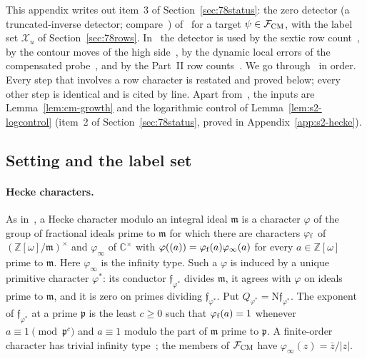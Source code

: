 \documentclass[11pt]{article}
\numberwithin{equation}{section}
\newcommand{\OO}{\mathbb Z[\omega]}
\newcommand{\N}{\mathrm N}
\begin{document}
This appendix writes out item~3 of Section~\ref{sec:78status}: the zero detector (a truncated-inverse detector; compare~\cite[Appendix~C]{MP24})
of~\cite[Section~8]{OAI78} for a target $\psi\in\mathcal F_{\rm CM}$, with the
label set $\mathcal X_u$ of Section~\ref{sec:78rows}. In~\cite{OAI78} the detector is used by the
sextic row count~\cite[Prop.~9.2]{OAI78}, by the contour moves of the high
side~\cite[Lemma~10.3]{OAI78}, by the dynamic local errors of the compensated
probe~\cite[Section~16.2]{OAI78}, and by the Part~II row counts~\cite[Section~19]{OAI78}.
We go through~\cite[Section~8]{OAI78} in order. Every step that involves a row character is
restated and proved below; every other step is identical and is cited by line. Apart
from~\cite{OAI78}, the inputs are Lemma~\ref{lem:cm-growth} and the logarithmic control of
Lemma~\ref{lem:s2-logcontrol} (item~2 of Section~\ref{sec:78status}, proved in Appendix~\ref{app:s2-hecke}).

\subsection{Setting and the label set}

\paragraph{Hecke characters.} As in~\cite[Ch.~VII, \S6]{Neukirch}, a Hecke character modulo an
integral ideal $\mathfrak m$ is a character $\varphi$ of the group of fractional ideals prime to
$\mathfrak m$ for which there are characters $\varphi_{\rm f}$ of $(\OO/\mathfrak m)^\times$ and
$\varphi_\infty$ of $\mathbb C^\times$ with $\varphi((a))=\varphi_{\rm f}(a)\varphi_\infty(a)$ for every
$a\in\OO$ prime to $\mathfrak m$. Here $\varphi_\infty$ is the infinity type. Such a $\varphi$ is
induced by a unique primitive character $\varphi^*$: its conductor $\mathfrak f_{\varphi^*}$ divides
$\mathfrak m$, it agrees with $\varphi$ on ideals prime to $\mathfrak m$, and it is zero on primes
dividing $\mathfrak f_{\varphi^*}$. Put $Q_{\varphi^*}=\N\mathfrak f_{\varphi^*}$. The exponent of
$\mathfrak f_{\varphi^*}$ at a prime $\mathfrak p$ is the least $c\ge0$ such that $\varphi_{\rm f}(a)=1$
whenever $a\equiv1\pmod{\mathfrak p^c}$ and $a\equiv1$ modulo the part of $\mathfrak m$ prime to
$\mathfrak p$. A finite-order character has trivial infinity type~\cite[proof of Lemma~4.8]{OAI78}; the
members of $\mathcal F_{\rm CM}$ have $\varphi_\infty(z)=\bar z/|z|$.
\end{document}
